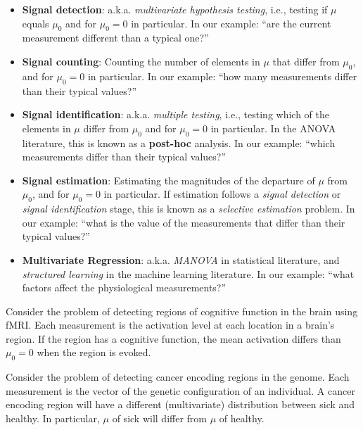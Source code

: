 \documentclass[]{book}
\theoremstyle{definition}
\theoremstyle{definition}
\theoremstyle{definition}
\theoremstyle{remark}
\let\BeginKnitrBlock\begin \let\EndKnitrBlock\end
\begin{document}
\begin{itemize}
\item
  \textbf{Signal detection}:
  a.k.a. \emph{multivariate hypothesis testing}, i.e., testing if \(\mu\) equals \(\mu_0\) and for \(\mu_0=0\) in particular.
  In our example: ``are the current measurement different than a typical one?''
\item
  \textbf{Signal counting}:
  Counting the number of elements in \(\mu\) that differ from \(\mu_0\), and for \(\mu_0=0\) in particular.
  In our example: ``how many measurements differ than their typical values?''
\item
  \textbf{Signal identification}:
  a.k.a. \emph{multiple testing}, i.e., testing which of the elements in \(\mu\) differ from \(\mu_0\) and for \(\mu_0=0\) in particular.
  In the ANOVA literature, this is known as a \textbf{post-hoc} analysis.
  In our example: ``which measurements differ than their typical values?''
\item
  \textbf{Signal estimation}:
  Estimating the magnitudes of the departure of \(\mu\) from \(\mu_0\), and for \(\mu_0=0\) in particular.
  If estimation follows a \emph{signal detection} or \emph{signal identification} stage, this is known as a \emph{selective estimation} problem.
  In our example: ``what is the value of the measurements that differ than their typical values?''
\item
  \textbf{Multivariate Regression}:
  a.k.a. \emph{MANOVA} in statistical literature, and \emph{structured learning} in the machine learning literature.
  In our example: ``what factors affect the physiological measurements?''
\end{itemize}

\BeginKnitrBlock{example}
\protect\hypertarget{exm:brain-imaging}{}{\label{exm:brain-imaging} }Consider the problem of detecting regions of cognitive function in the brain using fMRI.
Each measurement is the activation level at each location in a brain's region.
If the region has a cognitive function, the mean activation differs than \(\mu_0=0\) when the region is evoked.
\EndKnitrBlock{example}

\BeginKnitrBlock{example}
\protect\hypertarget{exm:genetics}{}{\label{exm:genetics} }Consider the problem of detecting cancer encoding regions in the genome.
Each measurement is the vector of the genetic configuration of an individual.
A cancer encoding region will have a different (multivariate) distribution between sick and healthy.
In particular, \(\mu\) of sick will differ from \(\mu\) of healthy.
\EndKnitrBlock{example}
\end{document}
